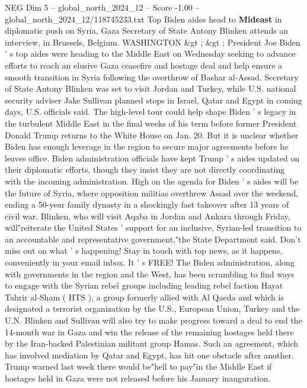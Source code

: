 \begin{textsample}{NEG Dim 5 – global\_north\_2024\_12 – Score -1.00 – global\_north\_2024\_12/118745233.txt}  \label{ex:f5_neg_336}
Top Biden aides head to \textbf{Mideast} in diplomatic push on Syria, Gaza Secretary of State Antony Blinken attends an interview, in Brussels, Belgium.
WASHINGTON \&gt ; \&gt ; President Joe Biden ' s top aides were heading to the Middle East on Wednesday seeking to advance efforts to reach an elusive Gaza ceasefire and hostage deal and help ensure a smooth transition in Syria following the overthrow of Bashar al-Assad.
Secretary of State Antony Blinken was set to visit Jordan and Turkey, while U.S. national security adviser Jake Sullivan planned stops in Israel, Qatar and Egypt in coming days, U.S. officials said.
The high-level tour could help shape Biden ' s legacy in the turbulent Middle East in the final weeks of his term before former President Donald Trump returns to the White House on Jan. 20.
But it is unclear whether Biden has enough leverage in the region to secure major agreements before he leaves office.
Biden administration officials have kept Trump ' s aides updated on their diplomatic efforts, though they insist they are not directly coordinating with the incoming administration.
High on the agenda for Biden ' s aides will be the future of Syria, where opposition militias overthrew Assad over the weekend, ending a 50-year family dynasty in a shockingly fast takeover after 13 years of civil war.
Blinken, who will visit Aqaba in Jordan and Ankara through Friday, will"reiterate the United States ' support for an inclusive, Syrian-led transition to an accountable and representative government,"the State Department said.
Don't miss out on what ' s happening!
Stay in touch with top news, as it happens, conveniently in your email inbox.
It ' s FREE!
The Biden administration, along with governments in the region and the West, has been scrambling to find ways to engage with the Syrian rebel groups including leading rebel faction Hayat Tahrir al-Sham ( HTS ), a group formerly allied with Al Qaeda and which is designated a terrorist organization by the U.S., European Union, Turkey and the U.N.
Blinken and Sullivan will also try to make progress toward a deal to end the 14-month war in Gaza and win the release of the remaining hostages held there by the Iran-backed Palestinian militant group Hamas.
Such an agreement, which has involved mediation by Qatar and Egypt, has hit one obstacle after another.
Trump warned last week there would be"hell to pay"in the Middle East if hostages held in Gaza were not released before his January inauguration.

\end{textsample}
